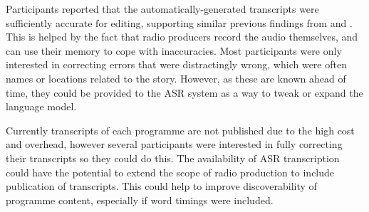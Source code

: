 Participants reported that the automatically-generated transcripts were sufficiently accurate for editing, supporting
similar previous findings from \citet{Whittaker2004} and \citet{Sivaraman2016}. This is helped by the fact that radio
producers record the audio themselves, and can use their memory to cope with inaccuracies. Most participants were only
interested in correcting errors that were distractingly wrong, which were often names or locations related to the
story. However, as these are known ahead of time, they could be provided to the ASR system as a way to tweak
or expand the language model.

Currently transcripts of each programme are not published due to the high cost and
overhead, however several participants were interested in fully correcting their transcripts so they could do this.
The availability of ASR transcription could have the potential to extend the scope of radio production to include
publication of transcripts. This could help to improve discoverability of programme content, especially if word timings
were included.








